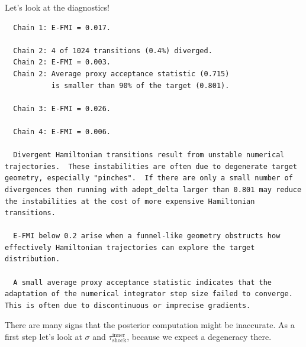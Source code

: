 \documentclass[
  letterpaper,
  DIV=11,
  numbers=noendperiod]{scrartcl}
\newenvironment{Shaded}{\begin{snugshade}}{\end{snugshade}}
\newcommand{\FunctionTok}[1]{\textcolor[rgb]{0.28,0.35,0.67}{#1}}
\newcommand{\NormalTok}[1]{\textcolor[rgb]{0.00,0.23,0.31}{#1}}
\newcommand{\OtherTok}[1]{\textcolor[rgb]{0.00,0.23,0.31}{#1}}
\newcommand{\SpecialCharTok}[1]{\textcolor[rgb]{0.37,0.37,0.37}{#1}}
\newcommand{\StringTok}[1]{\textcolor[rgb]{0.13,0.47,0.30}{#1}}
\begin{document}
\linespread{2}

Let's look at the diagnostics!

\linespread{0.5}

\begin{Shaded}
\end{Shaded}

\begin{verbatim}
  Chain 1: E-FMI = 0.017.

  Chain 2: 4 of 1024 transitions (0.4%) diverged.
  Chain 2: E-FMI = 0.003.
  Chain 2: Average proxy acceptance statistic (0.715)
           is smaller than 90% of the target (0.801).

  Chain 3: E-FMI = 0.026.

  Chain 4: E-FMI = 0.006.

  Divergent Hamiltonian transitions result from unstable numerical
trajectories.  These instabilities are often due to degenerate target
geometry, especially "pinches".  If there are only a small number of
divergences then running with adept_delta larger than 0.801 may reduce
the instabilities at the cost of more expensive Hamiltonian
transitions.

  E-FMI below 0.2 arise when a funnel-like geometry obstructs how
effectively Hamiltonian trajectories can explore the target
distribution.

  A small average proxy acceptance statistic indicates that the
adaptation of the numerical integrator step size failed to converge.
This is often due to discontinuous or imprecise gradients.
\end{verbatim}

\linespread{2}

There are many signs that the posterior computation might be inaccurate.
As a first step let's look at \(\sigma\) and
\(\tau^\text{inner}_\text{shock}\), because we expect a degeneracy
there.

\linespread{0.5}

\begin{Shaded}
\end{Shaded}
\end{document}
